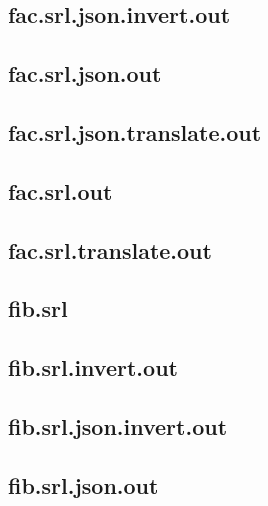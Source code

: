 \subsection{fac.srl.json.invert.out}
\label{app:fac_srl.json.invert.out}

\subsection{fac.srl.json.out}
\label{app:fac_srl.json.out}

\subsection{fac.srl.json.translate.out}
\label{app:fac_srl.json.translate.out}

\subsection{fac.srl.out}
\label{app:fac_srl.out}

\subsection{fac.srl.translate.out}
\label{app:fac_srl.translate.out}

\subsection{fib.srl}
\label{app:fib_srl}

\subsection{fib.srl.invert.out}
\label{app:fib_srl.invert.out}

\subsection{fib.srl.json.invert.out}
\label{app:fib_srl.json.invert.out}

\subsection{fib.srl.json.out}
\label{app:fib_srl.json.out}


